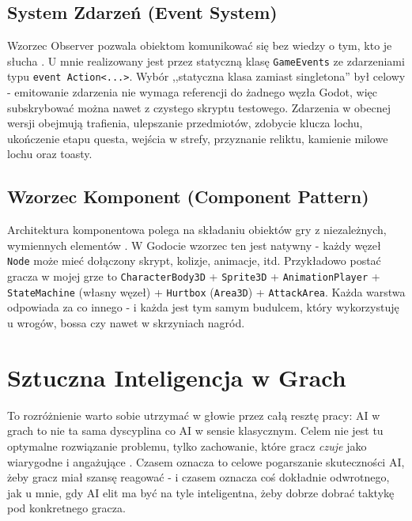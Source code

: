 \subsection{System Zdarzeń (Event System)}

Wzorzec Observer pozwala obiektom komunikować się bez wiedzy o tym, kto je słucha \cite{nystrom2014game}. U mnie realizowany jest przez statyczną klasę \texttt{GameEvents} ze zdarzeniami typu \texttt{event Action<...>}. Wybór ,,statyczna klasa zamiast singletona'' był celowy - emitowanie zdarzenia nie wymaga referencji do żadnego węzła Godot, więc subskrybować można nawet z czystego skryptu testowego. Zdarzenia w obecnej wersji obejmują trafienia, ulepszanie przedmiotów, zdobycie klucza lochu, ukończenie etapu questa, wejścia w strefy, przyznanie reliktu, kamienie milowe lochu oraz toasty.

\subsection{Wzorzec Komponent (Component Pattern)}

Architektura komponentowa polega na składaniu obiektów gry z niezależnych, wymiennych elementów \cite{nystrom2014game}. W Godocie wzorzec ten jest natywny - każdy węzeł \texttt{Node} może mieć dołączony skrypt, kolizje, animacje, itd. Przykładowo postać gracza w mojej grze to \texttt{CharacterBody3D} + \texttt{Sprite3D} + \texttt{AnimationPlayer} + \texttt{StateMachine} (własny węzeł) + \texttt{Hurtbox} (\texttt{Area3D}) + \texttt{AttackArea}. Każda warstwa odpowiada za co innego - i każda jest tym samym budulcem, który wykorzystuję u wrogów, bossa czy nawet w skrzyniach nagród.

\section{Sztuczna Inteligencja w Grach}

To rozróżnienie warto sobie utrzymać w głowie przez całą resztę pracy: AI w grach to nie ta sama dyscyplina co AI w sensie klasycznym. Celem nie jest tu optymalne rozwiązanie problemu, tylko zachowanie, które gracz \emph{czuje} jako wiarygodne i angażujące \cite{millington2009ai}. Czasem oznacza to celowe pogarszanie skuteczności AI, żeby gracz miał szansę reagować - i czasem oznacza coś dokładnie odwrotnego, jak u mnie, gdy AI elit ma być na tyle inteligentna, żeby dobrze dobrać taktykę pod konkretnego gracza.

